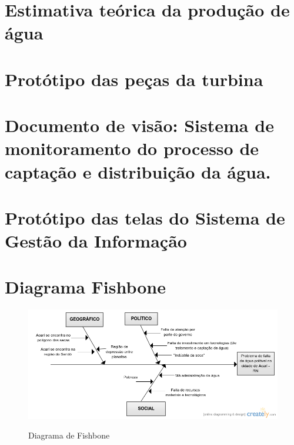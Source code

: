 \begin{anexosenv}
% 
%  
% 
% 
%   
%   
% 
%   
% 

\chapter{Estimativa teórica da produção de água}
  \label{estimativa_producao_agua}
  

\chapter{Protótipo das peças da turbina}
  \label{prototipos_catia}
  
  
\chapter{Documento de visão: Sistema de monitoramento do processo de captação e distribuição da água.}
  
  \label{doc_visao}
  
  
\chapter{Protótipo das telas do Sistema de Gestão da Informação}  
  
  \label{prototipo_sgi}
  
  
\chapter{Diagrama Fishbone}
  
  \begin{figure}[!h]
    \centering
    \includegraphics[scale = 0.7, angle = 90]{editaveis/figuras/fishbone}
    \label{fishbone}
    \caption{Diagrama de Fishbone}
   \end{figure}
   \FloatBarrier

\end{anexosenv}

